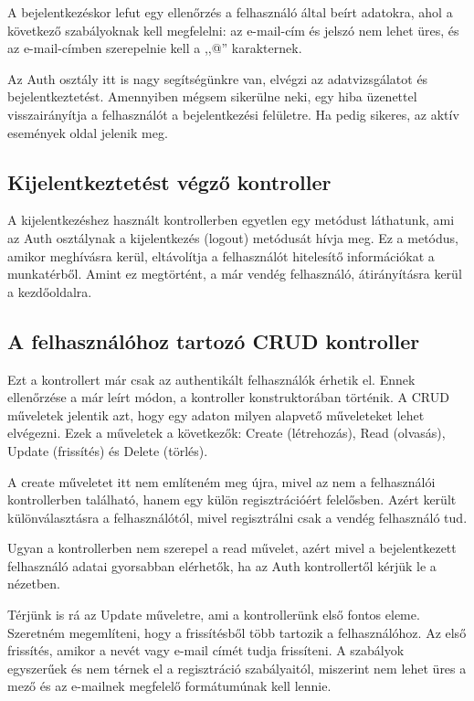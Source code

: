 \documentclass[
]{thesis-ekf}
\theoremstyle{definition}
\theoremstyle{remark}
\begin{document}
	A bejelentkezéskor lefut egy ellenőrzés a felhasználó által beírt adatokra, ahol a következő szabályoknak kell megfelelni: az e-mail-cím és jelszó nem lehet üres, és az e-mail-címben szerepelnie kell a ,,@'' karakternek.
	
	Az Auth osztály itt is nagy segítségünkre van, elvégzi az adatvizsgálatot és bejelentkeztetést. Amennyiben mégsem sikerülne neki, egy hiba üzenettel visszairányítja a felhasználót a bejelentkezési felületre. Ha pedig sikeres, az aktív események oldal jelenik meg.
	
	\subsection{Kijelentkeztetést végző kontroller} 
	A kijelentkezéshez használt kontrollerben egyetlen egy metódust láthatunk, ami az Auth osztálynak a kijelentkezés (logout) metódusát hívja meg. Ez a metódus, amikor meghívásra kerül, eltávolítja a felhasználót hitelesítő információkat a munkatérből. Amint ez megtörtént, a már vendég felhasználó, átirányításra kerül a kezdőoldalra.
	
	\subsection{A felhasználóhoz tartozó CRUD kontroller}
	Ezt a kontrollert már csak az authentikált felhasználók érhetik el. Ennek ellenőrzése a már leírt módon, a kontroller konstruktorában történik. A CRUD műveletek jelentik azt, hogy egy adaton milyen alapvető műveleteket lehet elvégezni. Ezek a műveletek a következők: Create (létrehozás), Read (olvasás), Update (frissítés) és Delete (törlés). 
	
	A create műveletet itt nem említeném meg újra, mivel az nem a felhasználói kontrollerben található, hanem egy külön regisztrációért felelősben. Azért került különválasztásra a felhasználótól, mivel regisztrálni csak a vendég felhasználó tud. 
	
	Ugyan a kontrollerben nem szerepel a read művelet, azért mivel a bejelentkezett felhasználó adatai gyorsabban elérhetők, ha az Auth kontrollertől kérjük le a nézetben.
	
	Térjünk is rá az Update műveletre, ami a kontrollerünk első fontos eleme. Szeretném megemlíteni, hogy a frissítésből több tartozik a felhasználóhoz. Az első frissítés, amikor a nevét vagy e-mail címét tudja frissíteni. A szabályok egyszerűek és nem térnek el a regisztráció szabályaitól, miszerint nem lehet üres a mező és az e-mailnek megfelelő formátumúnak kell lennie.
	
\end{document}
